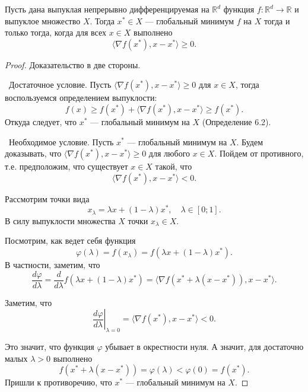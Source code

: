 \begin{theorem}
    Пусть дана выпуклая непрерывно дифференцируемая на $\mathbb{R}^d$ функция $f : \mathbb{R}^d \to \mathbb{R}$ и
    выпуклое множество $X$. Тогда $x^* \in X$ — глобальный минимум $f$ на $X$ тогда и только тогда,
    когда для всех $x \in X$ выполнено
    $$\langle \nabla f(x^*), x - x^* \rangle \geq 0.$$
\end{theorem}
\begin{proof}
    Доказательство в две стороны.

    \textbullet \, Достаточное условие. 
    Пусть $\langle \nabla f(x^*), x - x^* \rangle \geq 0$ для $x \in X$, тогда воспользуемся определением выпуклости:
    $$f(x) \geq f(x^*) + \langle \nabla f(x^*), x - x^* \rangle \geq f(x^*).$$
    Откуда следует, что $x^*$ — глобальный минимум на $X$ (Определение 6.2).

    \textbullet \, Необходимое условие. 
    Пусть $x^*$ — глобальный минимум на $X$. 
    Будем доказывать, что $\langle \nabla f(x^*), x - x^* \rangle \geq 0$ для любого $x \in X$. 
    Пойдем от противного, т.е. предположим, что существует $x \in X$ такой, что
    $$\langle \nabla f(x^*), x - x^* \rangle < 0.$$

    Рассмотрим точки вида
    $$x_\lambda = \lambda x + (1 - \lambda) x^*, \quad \lambda \in [0; 1].$$
    В силу выпуклости множества $X$ точки $x_\lambda \in X$. 

    Посмотрим, как ведет себя функция
    $$\varphi(\lambda) = f(x_\lambda) = f(\lambda x + (1 - \lambda) x^*).$$
    В частности, заметим, что
    $$\frac{d\varphi}{d\lambda} = \frac{d}{d\lambda} f(\lambda x + (1 - \lambda) x^*) = \langle \nabla f(x^* + \lambda(x - x^*)), x - x^* \rangle.$$

    Заметим, что
    $$\left. \frac{d\varphi}{d\lambda} \right|_{\lambda = 0} = \langle \nabla f(x^*), x - x^* \rangle < 0.$$
    
    Это значит, что функция $\varphi$ убывает в окрестности нуля. А значит, для достаточно малых $\lambda > 0$ выполнено
    $$f(x^* + \lambda (x - x^*)) = \varphi(\lambda) < \varphi(0) = f(x^*).$$
    Пришли к противоречию, что $x^*$ — глобальный минимум на $X$.
\end{proof}
